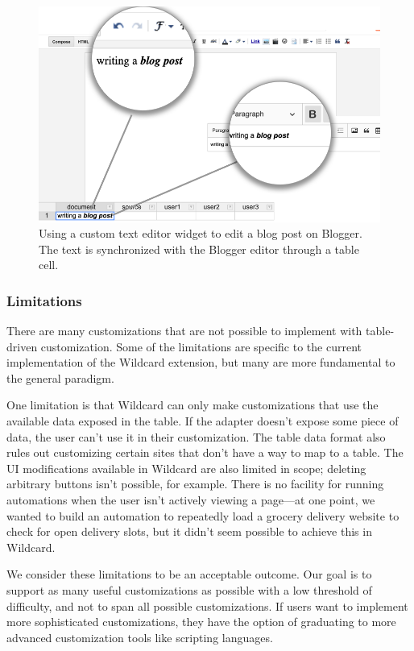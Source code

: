 \documentclass[sigplan,screen,10pt,anonymous,review]{acmart}
\begin{document}
\begin{figure}
\hypertarget{fig:blogger}{%
\centering
\includegraphics[width=\columnwidth]{media/blogger.png}
\caption{Using a custom text editor widget to edit a blog post on Blogger. The text is synchronized with the Blogger editor through a table cell.}\label{fig:blogger}
}
\end{figure}

\hypertarget{limitations}{%
\subsubsection{Limitations}\label{limitations}}

There are many customizations that are not possible to implement with
table-driven customization. Some of the limitations are specific to the
current implementation of the Wildcard extension, but many are more
fundamental to the general paradigm.

One limitation is that Wildcard can only make customizations that use
the available data exposed in the table. If the adapter doesn't expose
some piece of data, the user can't use it in their customization. The
table data format also rules out customizing certain sites that don't
have a way to map to a table. The UI modifications available in Wildcard
are also limited in scope; deleting arbitrary buttons isn't possible,
for example. There is no facility for running automations when the user
isn't actively viewing a page---at one point, we wanted to build an
automation to repeatedly load a grocery delivery website to check for
open delivery slots, but it didn't seem possible to achieve this in
Wildcard.

We consider these limitations to be an acceptable outcome. Our goal is
to support as many useful customizations as possible with a low
threshold of difficulty, and not to span all possible customizations. If
users want to implement more sophisticated customizations, they have the
option of graduating to more advanced customization tools like scripting
languages.
\end{document}
